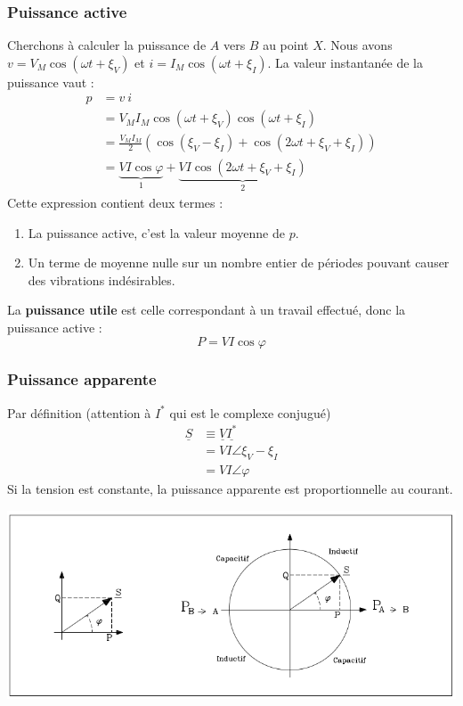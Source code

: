 \subsubsection{Puissance active}
Cherchons à calculer la puissance de $A$ vers $B$ au point $X$. Nous 
avons $v = V_M\cos(\omega t +\xi_V)$ et $i = I_M\cos(\omega t + \xi_I)$. 
La valeur instantanée de la puissance vaut :
\begin{equation}
	\begin{array}{ll}
		p & = v\ i                                                               \\
		  & = V_MI_M\cos(\omega t +\xi_V)\cos(\omega t +\xi_I)                   \\
		  & = \frac{V_MI_M}{2}(\cos(\xi_V-\xi_I) + \cos(2\omega t +\xi_V+\xi_I)) \\
		  & = \underbrace{VI \cos\varphi}_{1} + \underbrace{VI \cos(2\omega t +  
		\xi_V+\xi_I)}_{2}
	\end{array}
	\label{eq:1.6}
\end{equation}
Cette expression contient deux termes :
\begin{enumerate}
	\item La puissance active, c'est la valeur moyenne de $p$.
	\item Un terme de moyenne nulle sur un nombre entier de périodes pouvant causer des vibrations indésirables.
\end{enumerate}
La \textbf{puissance utile} est celle correspondant à un travail 
effectué, donc la puissance active :
\begin{equation}
	P = VI \cos\varphi
\end{equation}
		
\subsubsection{Puissance apparente}
Par définition (attention à $I^*$ qui est le complexe conjugué)
\begin{equation}
	\begin{array}{ll}
		\underline{S} & \equiv \underline{V}\underline{I^*} \\
		              & = VI \angle \xi_V-\xi_I             \\
		              & = VI\angle\varphi                   
	\end{array}
\end{equation}
Si la tension est constante, la puissance apparente est proportionnelle 
au courant.
\begin{center}
	\includegraphics[scale=0.4]{ch1/image4.png}
\end{center}	
		

